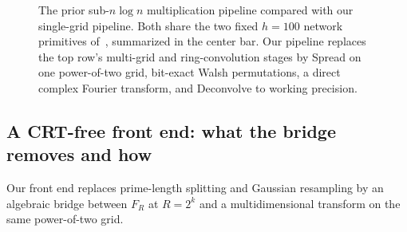 \begin{figure}[t]
\caption{The prior sub-$n\log n$ multiplication pipeline compared with our single-grid pipeline. Both share the two fixed $h=100$ network primitives of~\cite{OAI26}, summarized in the center bar. Our pipeline replaces the top row's multi-grid and ring-convolution stages by \textsf{Spread} on one power-of-two grid, bit-exact Walsh permutations, a direct complex Fourier transform, and \textsf{Deconvolve} to working precision.}
\label{fig:pipeline}
\end{figure}

\subsection{A CRT-free front end: what the bridge removes and how}\label{sec:overview-bridge}

Our front end replaces prime-length splitting and Gaussian resampling by an algebraic bridge between $F_R$ at $R=2^k$ and a multidimensional transform on the same power-of-two grid.

